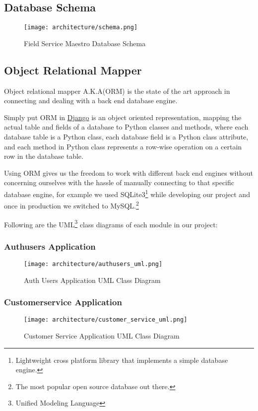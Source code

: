 \subsection{Database Schema}
	\begin{figure}[ht]
		\texttt{[image: architecture/schema.png]}
		\caption{Field Service Maestro Database Schema}
	\end{figure}

\subsection{Object Relational Mapper}
	Object relational mapper A.K.A(ORM) is the state of the art approach in connecting and dealing with a back end database engine.
	
	Simply put ORM in \href{https://www.djangoproject.com}{Django} is an object oriented representation, mapping the actual table and fields of a database to Python classes and methods, where each database table is a Python class, each database field is a Python class attribute, and each method in Python class represents a row-wise operation on a certain row in the database table.
	
	Using ORM gives us the freedom to work with different back end engines without concerning ourselves with the hassle of manually connecting to that specific database engine, for example we used SQLite3\footnote{Lightweight cross platform library that implements a simple database engine.} while developing our project and once in production we switched to MySQL.\footnote{The most popular open source database out there.}
	
	Following are the UML\footnote{Unified Modeling Language} class diagrams of each module in our project:
	\subsubsection{Authusers Application}
		\begin{figure}[ht]
			\centering
			\texttt{[image: architecture/authusers\_uml.png]}
			\caption{Auth Users Application UML Class Diagram}
		\end{figure}
	\subsubsection{Customerservice Application}
		\begin{figure}[ht]
			\centering
			\texttt{[image: architecture/customer\_service\_uml.png]}
			\caption{Customer Service Application UML Class Diagram}
		\end{figure}
